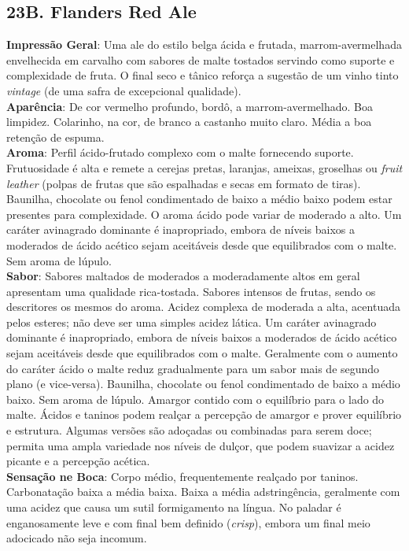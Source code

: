 \subsection*{23B. Flanders Red Ale}
\textbf{Impressão Geral}: Uma ale do estilo belga ácida e frutada, marrom-avermelhada envelhecida em carvalho com sabores de malte tostados servindo como suporte e complexidade de fruta. O final seco e tânico reforça a sugestão de um vinho tinto \textit{vintage} (de uma safra de excepcional qualidade). \\
\textbf{Aparência}: De cor vermelho profundo, bordô, a marrom-avermelhado. Boa limpidez. Colarinho, na cor, de branco a castanho muito claro. Média a boa retenção de espuma. \\
\textbf{Aroma}: Perfil ácido-frutado complexo com o malte fornecendo suporte. Frutuosidade é alta e remete a cerejas pretas, laranjas, ameixas, groselhas ou \textit{fruit leather} (polpas de frutas que são espalhadas e secas em formato de tiras). Baunilha, chocolate ou fenol condimentado de baixo a médio baixo podem estar presentes para complexidade. O aroma ácido pode variar de moderado a alto. Um caráter avinagrado dominante é inapropriado, embora de níveis baixos a moderados de ácido acético sejam aceitáveis desde que equilibrados com o malte. Sem aroma de lúpulo. \\
\textbf{Sabor}: Sabores maltados de moderados a moderadamente altos em geral apresentam uma qualidade rica-tostada. Sabores intensos de frutas, sendo os descritores os mesmos do aroma. Acidez complexa de moderada a alta, acentuada pelos esteres; não deve ser uma simples acidez lática. Um caráter avinagrado dominante é inapropriado, embora de níveis baixos a moderados de ácido acético sejam aceitáveis desde que equilibrados com o malte. Geralmente com o aumento do caráter ácido o malte reduz gradualmente para um sabor mais de segundo plano (e vice-versa). Baunilha, chocolate ou fenol condimentado de baixo a médio baixo. Sem aroma de lúpulo. Amargor contido com o equilíbrio para o lado do malte. Ácidos e taninos podem realçar a percepção de amargor e prover equilíbrio e estrutura. Algumas versões são adoçadas ou combinadas para serem doce; permita uma ampla variedade nos níveis de dulçor, que podem suavizar a acidez picante e a percepção acética. \\
\textbf{Sensação ne Boca}: Corpo médio, frequentemente realçado por taninos. Carbonatação baixa a média baixa. Baixa a média adstringência, geralmente com uma acidez que causa um sutil formigamento na língua. No paladar é enganosamente leve e com final bem definido (\textit{crisp}), embora um final meio adocicado não seja incomum. \\
